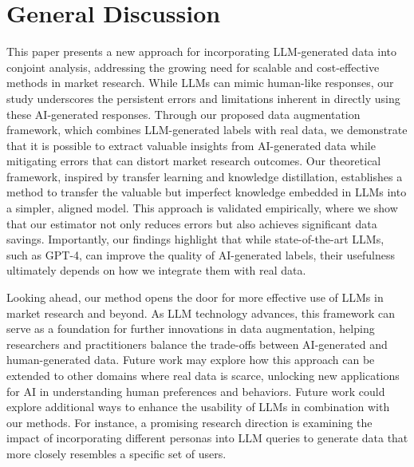 \section{General Discussion}
\label{sec:conclusion}

This paper presents a new approach for incorporating LLM-generated data into conjoint analysis, addressing the growing need for scalable and cost-effective methods in market research. While LLMs can mimic human-like responses, our study underscores the persistent errors and limitations inherent in directly using these AI-generated responses. Through our proposed data augmentation framework, which combines LLM-generated labels with real data, we demonstrate that it is possible to extract valuable insights from AI-generated data while mitigating errors that can distort market research outcomes.
Our theoretical framework, inspired by transfer learning and knowledge distillation, establishes a method to transfer the valuable but imperfect knowledge embedded in LLMs into a simpler, aligned model. This approach is validated empirically, where we show that our estimator not only reduces errors but also achieves significant data savings. Importantly, our findings highlight that while state-of-the-art LLMs, such as GPT-4, can improve the quality of AI-generated labels, their usefulness ultimately depends on how we integrate them with real data.

Looking ahead, our method opens the door for more effective use of LLMs in market research and beyond. As LLM technology advances, this framework can serve as a foundation for further innovations in data augmentation, helping researchers and practitioners balance the trade-offs between AI-generated and human-generated data. Future work may explore how this approach can be extended to other domains where real data is scarce, unlocking new applications for AI in understanding human preferences and behaviors. Future work could explore additional ways to enhance the usability of LLMs in combination with our methods. For instance, a promising research direction is examining the impact of incorporating different personas into LLM queries to generate data that more closely resembles a specific set of users. 





